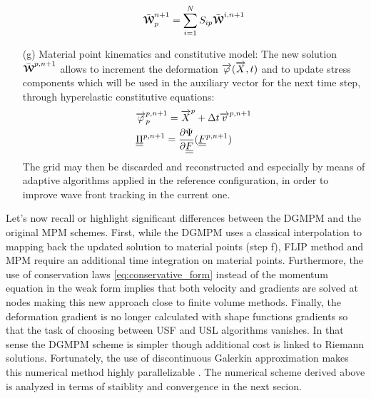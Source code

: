 \begin{itemize}
  \begin{equation}
    \bar{{\boldsymbol{\mathcal{W}}}}^{n+1}_p = \sum_{i=1}^{N} S_{ip}\bar{{\boldsymbol{\mathcal{W}}}}^{i,n+1}
  \end{equation}
\item[(g)] Material point kinematics and constitutive model: The new solution $\bar{{\boldsymbol{\mathcal{W}}}}^{p,n+1}$ allows to increment the deformation ${\overrightarrow{\varphi}}({\overrightarrow{X}},t)$ and to update stress components which will be used in the auxiliary vector for the next time step, through hyperelastic constitutive equations:
  \begin{align}
    & {\overrightarrow{\varphi}}^{p,n+1}_p = {\overrightarrow{X}}^p + \Delta t {\overrightarrow{v}}^{p,n+1} \\
    & {\underline{\underline{\Pi}}}^{p,n+1} =  \frac{\partial \Psi}{\partial {\underline{\underline{F}}}}({\underline{\underline{F}}}^{p,n+1})
  \end{align}
  The grid may then be discarded and reconstructed and especially by means of adaptive algorithms applied in the reference configuration, in order to improve wave front tracking in the current one.
\end{itemize}

Let's now recall or highlight significant differences between the DGMPM and the original MPM schemes. 
First, while the DGMPM uses a classical interpolation to mapping back the updated solution to material points (step f), FLIP method and MPM require an additional time integration on material points. 
Furthermore, the use of conservation laws \eqref{eq:conservative_form} instead of the momentum equation in the weak form implies that both velocity and gradients are solved at nodes making this new approach close to finite volume methods. 
Finally, the deformation gradient is no longer calculated with shape functions gradients so that the task of choosing between USF and USL algorithms vanishes. In that sense the DGMPM scheme is simpler though additional cost is linked to Riemann solutions. Fortunately, the use of discontinuous Galerkin approximation makes this numerical method highly parallelizable \cite{Cockburn}. The numerical scheme derived above is analyzed in terms of staiblity and convergence in the next secion.


